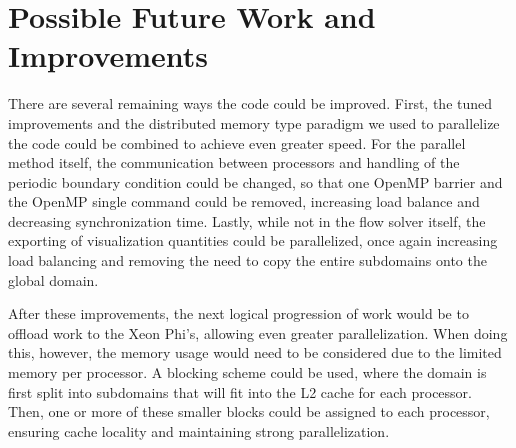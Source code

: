 \documentclass[12pt]{article}
\begin{document}
\section{Possible Future Work and Improvements}
There are several remaining ways the code could be improved. First, the tuned improvements and the distributed memory type paradigm we used to parallelize the code could be combined to achieve even greater speed. For the parallel method itself, the communication between processors and handling of the periodic boundary condition could be changed, so that one OpenMP barrier and the OpenMP single command could be removed, increasing load balance and decreasing synchronization time. Lastly, while not in the flow solver itself, the exporting of visualization quantities could be parallelized, once again increasing load balancing and removing the need to copy the entire subdomains onto the global domain.

After these improvements, the next logical progression of work would be to offload work to the Xeon Phi's, allowing even greater parallelization. When doing this, however, the memory usage would need to be considered due to the limited memory per processor. A blocking scheme could be used, where the domain is first split into subdomains that will fit into the L2 cache for each processor. Then, one or more of these smaller blocks could be assigned to each processor, ensuring cache locality and maintaining strong parallelization.




%	 
%	
	
\end{document}
